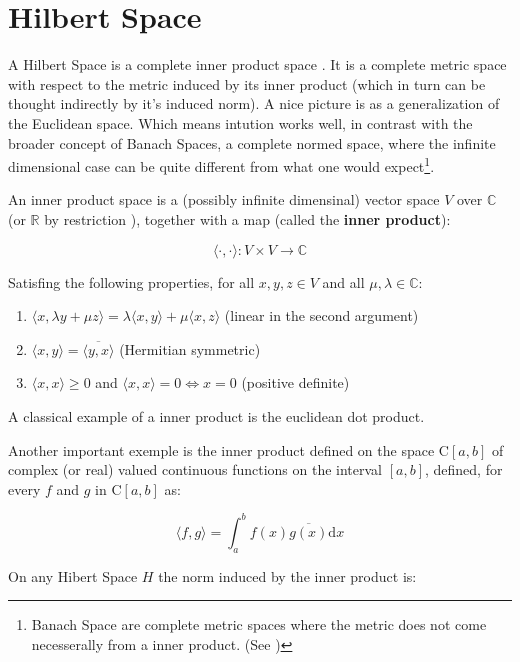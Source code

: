 
\section{Hilbert Space}

A Hilbert Space is a complete inner product space \cite{HS-YN:11}. It is a
complete metric space with respect to the metric induced by its inner product
(which in turn can be thought indirectly by it's induced norm). A nice picture
is as a generalization of the Euclidean space. Which means intution works well,
in contrast with the broader concept of Banach Spaces, a complete normed space,
where the infinite dimensional case can be quite different from what one would
expect\footnote{Banach Space are complete metric spaces where the metric does
not come necesserally from a inner product. (See \citet{HS-HJNB:00})}.

An inner product space\cite{HS-HJNB:00} is a (possibly infinite dimensinal)
vector space $V$ over $\mathbb{C}$ (or $\mathbb{R}$ by restriction ), together
with a map (called the \textbf{inner product}):

\[  \langle\cdot,\cdot\rangle: V \times V \to \mathbb{C} \]

Satisfing the following properties, for all $x,y,z \in V$ and all $\mu, \lambda
\in \mathbb{C}$:

\begin{enumerate}[I]
  \item \(  \langle x,\lambda y + \mu z  \rangle = \lambda\langle	 x,y\rangle +
  \mu \langle x,z \rangle \) (linear in the second argument)
  \item \( \langle x,y \rangle = \overline{\langle y,x \rangle } \) (Hermitian
  symmetric)
  \item  \( \langle x,x \rangle \geq 0 \) and \( \langle x,x \rangle = 0
  \Leftrightarrow x = 0 \) (positive definite)
\end{enumerate}

A classical example of a inner product is the euclidean dot product.

Another important exemple is the inner product defined on the space C$[a,b]$ of
complex (or real) valued continuous functions on the interval $[a,b]$, defined,
for every $f$ and $g$ in C$[a,b]$ as:

\begin{equation}\label{eq::func_inner}
  \langle f,g\rangle = \int_a^b f(x)\overline{g(x)} \mathrm{d}x
\end{equation}

On any Hibert Space $H$ the norm induced by the inner product is:

